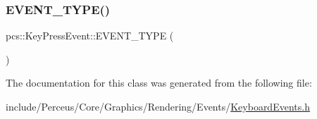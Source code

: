 \subsubsection{\texorpdfstring{E\+V\+E\+N\+T\+\_\+\+T\+Y\+P\+E()}{EVENT\_TYPE()}}
{\footnotesize\ttfamily pcs\+::\+Key\+Press\+Event\+::\+E\+V\+E\+N\+T\+\_\+\+T\+Y\+PE (\begin{DoxyParamCaption}\item[{\hyperlink{namespacepcs_a12954f53e3d7d6a8765fd723e1ce8db4a65a1aa093fcf3acd50b318f1942c02f5}{Key\+Press}}]{ }\end{DoxyParamCaption})}



The documentation for this class was generated from the following file\+:\begin{DoxyCompactItemize}
\item 
include/\+Perceus/\+Core/\+Graphics/\+Rendering/\+Events/\hyperlink{KeyboardEvents_8h}{Keyboard\+Events.\+h}\end{DoxyCompactItemize}
